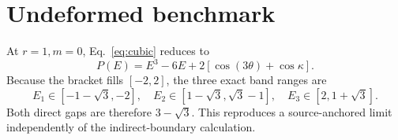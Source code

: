 \documentclass[aps,prb,preprint,superscriptaddress,nofootinbib]{revtex4-2}
\begin{document}
\section{Undeformed benchmark}

At $r=1,m=0$, Eq.~\eqref{eq:cubic} reduces to
\begin{equation}
P(E)=E^3-6E+2[\cos(3\theta)+\cos\kappa].
\end{equation}
Because the bracket fills $[-2,2]$, the three exact band ranges are
\begin{equation}
E_1\in[-1-\sqrt3,-2],\quad
E_2\in[1-\sqrt3,\sqrt3-1],\quad
E_3\in[2,1+\sqrt3].
\end{equation}
Both direct gaps are therefore $3-\sqrt3$.  This reproduces a source-anchored
limit independently of the indirect-boundary calculation.


\end{document}
